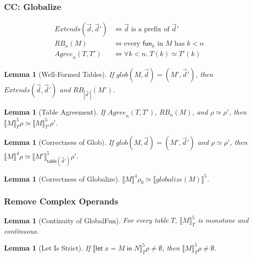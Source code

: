 \documentclass[10pt]{article}
\theoremstyle{acmplain}
\newtheorem{lemma}[theorem]{Lemma}
\newcommand{\SEM}[1]{\llbracket #1 \rrbracket}
\newcommand{\key}[1]{\mathsf{#1}}
\newcommand{\pass}[1]{\mathit{#1}}
\newcommand{\Let}{\key{let}\;}
\newcommand{\In}{\;\key{in}\;}
\newcommand{\funref}[1]{\key{fun}_{#1}}
\newcommand{\NE}{\neq\emptyset}
\begin{document}
\subsubsection{CC: Globalize}

\begin{align*}
  \mathit{Extends}(\vec{d}, \vec{d}') &\iff \vec{d} \text{ is a prefix of } \vec{d}' \\
  \mathit{RB}_n(M) &\iff \text{every } \funref{k} \text{ in } M \text{ has } k < n \\
  \mathit{Agree}_n(T, T') &\iff \forall k < n.\; T(k) \simeq T'(k)
\end{align*}
\begin{lemma}[Well-Formed Tables]\label{lem:glob-wf}
If $\pass{glob}(M, \vec{d}) = (M', \vec{d}')$, then
$\mathit{Extends}(\vec{d}, \vec{d}')$ and $\mathit{RB}_{|\vec{d}'|}(M')$.
\end{lemma}

\begin{lemma}[Table Agreement]\label{lem:agree}
If $\mathit{Agree}_n(T, T')$, $\mathit{RB}_n(M)$, and $\rho \simeq \rho'$, then
$\SEM{M}^{\mathrm{5}}_T\rho \simeq \SEM{M}^{\mathrm{5}}_{T'}\rho'$.
\end{lemma}

\begin{lemma}[Correctness of Glob]\label{lem:glob}
If $\pass{glob}(M, \vec{d}) = (M', \vec{d}')$ and $\rho \simeq \rho'$, then
$\SEM{M}^{\mathrm{4}}\rho \simeq \SEM{M'}^{\mathrm{5}}_{\key{table}(\vec{d}')}\rho'$.
\end{lemma}

\begin{lemma}[Correctness of Globalize]\label{lem:globalize}
$\SEM{M}^{\mathrm{4}}\rho_0 \simeq \SEM{\pass{globalize}(M)}^{\mathrm{5}}$.
\end{lemma}

\subsubsection{Remove Complex Operands}

\begin{lemma}[Continuity of GlobalFun]\label{lem:continuity5}
For every table $T$, $\SEM{M}^{\mathrm{5}}_T$ is monotone and continuous.
\end{lemma}

\begin{lemma}[Let Is Strict]\label{lem:let-strict}
If $\SEM{\Let x = M \In N}^{\mathrm{5}}_T\rho \NE$, then $\SEM{M}^{\mathrm{5}}_T\rho \NE$.
\end{lemma}
\end{document}
